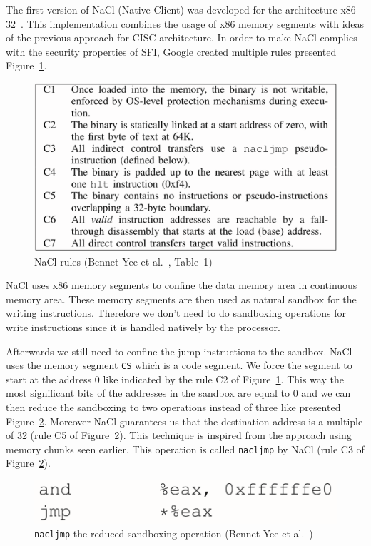 \documentclass[11pt]{sdm}
\begin{document}
The first version of NaCl (Native Client) was developed for the architecture x86-32~\cite{Yee:2010:NCS:1629175.1629203}. This implementation combines the usage of x86 memory segments with ideas of the previous approach for CISC architecture. In order to make NaCl complies with the security properties of SFI, Google created multiple rules presented Figure~\ref{nacl_constraints}.

\begin{figure}[!ht]
\centering
\includegraphics[scale=0.25]{images/nacl_constraints.png}
\caption{NaCl rules (Bennet Yee et al.~\cite{Yee:2010:NCS:1629175.1629203}, Table~1)}
\label{nacl_constraints}
\end{figure}


NaCl uses x86 memory segments to confine the data memory area in continuous memory area. These memory segments are then used as natural sandbox for the writing instructions. Therefore we don't need to do sandboxing operations for write instructions since it is handled natively by the processor.

Afterwards we still need to confine the jump instructions to the sandbox. NaCl uses the memory segment \texttt{CS} which is a code segment. We force the segment to start at the address 0 like indicated by the rule C2 of Figure~\ref{nacl_constraints}. This way the most significant bits of the addresses in the sandbox are equal to 0 and we can then reduce the sandboxing to two operations instead of three like presented Figure~\ref{nacl_jump}.
Moreover NaCl guarantees us that the destination address is a multiple of 32 (rule C5 of Figure~\ref{nacl_jump}). This technique is inspired from the approach using memory chunks seen earlier. This operation  is called \texttt{nacljmp} by NaCl (rule C3 of Figure~\ref{nacl_jump}).

\begin{figure}[!ht]
\centering
\includegraphics[scale=0.22]{images/nacl_jump.png}
\caption{\texttt{nacljmp} the reduced sandboxing operation (Bennet Yee et al.~\cite{Yee:2010:NCS:1629175.1629203})}
\label{nacl_jump}
\end{figure}
\end{document}
